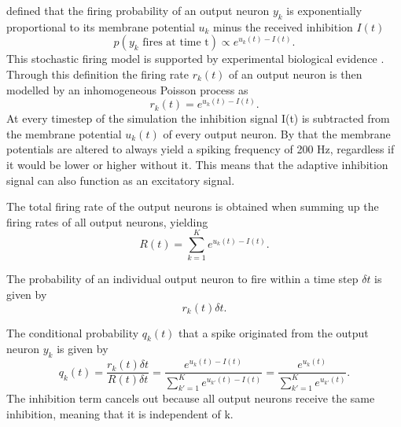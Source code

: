 \citet{nessler} defined that the firing probability of an output neuron  $y_k$ is exponentially proportional to its membrane potential $u_k$ minus the received inhibition $I(t)$
\begin{equation}
\label{eqn:pVonY}
p(y_k \text{ fires at time t}) \propto e^{u_k(t) - I(t)}.
\end{equation}
This stochastic firing model is supported by experimental biological evidence \citep{woDasEHerkommt}. Through this definition the firing rate $r_k(t)$ of an output neuron is then modelled by an inhomogeneous Poisson process as
\begin{equation}
\label{eqn:rk}
r_k(t) = e^{u_k(t) - I(t)}.
\end{equation}
At every timestep of the simulation the inhibition signal I(t) is subtracted from the membrane potential $u_k(t)$ of every output neuron. By that the membrane potentials are altered to always yield a spiking frequency of 200 Hz, regardless if it would be lower or higher without it. This means that the adaptive inhibition signal can also function as an excitatory signal. 

The total firing rate of the output neurons is obtained when summing up the firing rates of all output neurons, yielding 
\begin{equation}
\label{eqn:R}
R(t) = \sum_{k=1}^K e^{u_k(t) - I(t)}.
\end{equation}

The probability of an individual output neuron to fire within a time step $\delta t$ is given by
\begin{equation}
\label{eqn:rkdt}
r_k(t) \delta t.
\end{equation}

The conditional probability $q_k(t)$ that a spike originated from the output neuron $y_k$ is given by
\begin{equation}
\label{eqn:qk}
q_k(t) = \frac{r_k(t) \delta t}{R(t) \delta t} = \frac{e^{u_k(t) - I(t)}}{\sum_{k'=1}^K e^{u_{k'}(t) - I(t)}} = \frac{e^{u_k(t)}}{\sum_{k'=1}^K e^{u_{k'}(t)}}.
\end{equation}
The inhibition term cancels out because all output neurons receive the same inhibition, meaning that it is independent of k.

